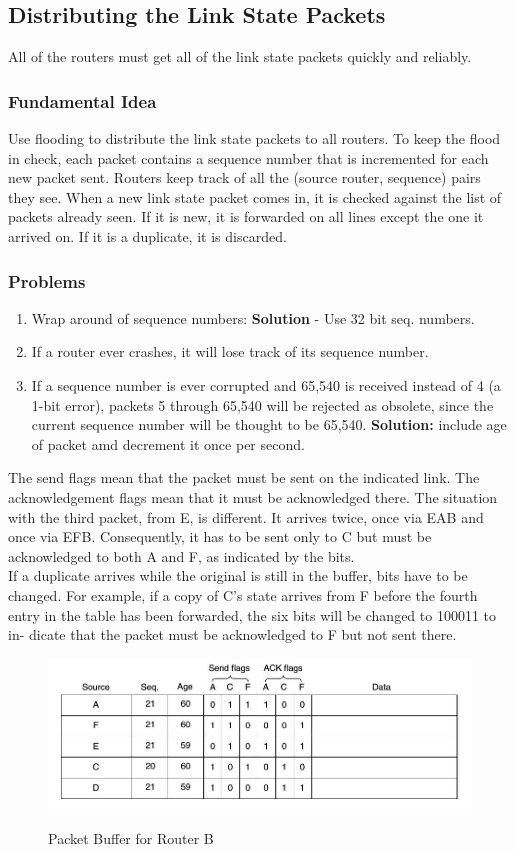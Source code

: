 \documentclass[a4paper,oneside]{book}
\begin{document}
\subsection{Distributing the Link State Packets}
All of the routers must get all of the link state packets quickly and reliably. 
\subsubsection{Fundamental Idea}
Use flooding to distribute the link state packets to all routers.  To keep the flood in check, each packet contains a sequence number that is incremented for each new packet sent. Routers keep track of all the (source router, sequence) pairs they see. When a new link state
packet comes in, it is checked against the list of packets already seen. If it is new, it is forwarded on all lines except the one it arrived on. If it is a duplicate, it is discarded.
\subsubsection{Problems}
\begin{enumerate}
\item Wrap around of sequence numbers: \textbf{Solution} - Use 32 bit seq. numbers.
\item If a router ever crashes, it will lose track of its sequence number.
\item If a sequence number is ever corrupted and 65,540 is received instead of 4 (a 1-bit error), packets 5 through 65,540 will be rejected as obsolete, since the current sequence number will be thought to be 65,540. \textbf{Solution:} include age of packet amd decrement it once per second.
\end{enumerate}
 The send flags mean that the packet must be sent on the indicated link. The acknowledgement flags mean that it must be acknowledged there.  The situation with the third packet, from E, is different. It arrives  twice, once via EAB and once via EFB. Consequently, it has to be sent only to C  but must be acknowledged to both A and F, as indicated by the bits.\\
 If a duplicate arrives while the original is still in the buffer, bits have to be  changed. For example, if a copy of C’s state arrives from F before the fourth  entry in the table has been forwarded, the six bits will be changed to 100011 to in-  dicate that the packet must be acknowledged to F but not sent there.
\begin{figure}[H]
\caption{Packet Buffer for Router B}
\includegraphics[scale=0.6]{Images/packet-buffer}
\label{fig: cn_lsp}
\end{figure} 
\end{document}
